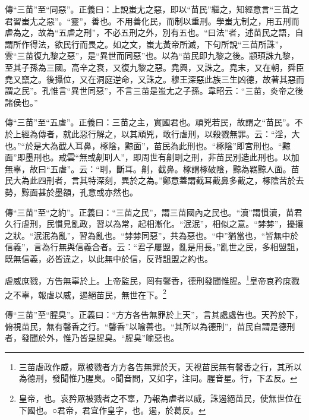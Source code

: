 {\noindent\zhuan{}\fzbyks 傳“三苗”至“同惡”。正義曰：上說蚩尢之惡，即以“苗民”繼之，知經意言“三苗之君習蚩尢之惡”。“靈”，善也。不用善化民，而制以重刑。學蚩尢制之，用五刑而虐為之，故為“五虐之刑”，不必五刑之外，別有五也。“曰法”者，述苗民之語，自謂所作得法，欲民行而畏之。如之文，蚩尢黃帝所滅，下句所說“三苗所誅”，雲“三苗復九黎之惡”，是“異世而同惡”也。以為“苗民即九黎之後。顓頊誅九黎，至其子孫為三國。高辛之衰，又復九黎之惡。堯興，又誅之。堯末，又在朝，舜臣堯又竄之。後攝位，又在洞庭逆命，又誅之。穆王深惡此族三生凶德，故著其惡而謂之民”。孔惟言“異世同惡”，不言三苗是蚩尢之子孫。韋昭云：“三苗，炎帝之後諸侯也。” \par}

{\noindent\zhuan{}\fzbyks 傳“三苗”至“五虐”。正義曰：三苗之主，實國君也。頑兇若民，故謂之“苗民”。不於上經為傳者，就此惡行解之，以其頑兇，敢行虐刑，以殺戮無罪。云：“淫，大也。”“於是大為截人耳鼻，椓陰，黥面”，苗民為此刑也。“椓陰”即宮刑也。“黥面”即墨刑也。戒雲“無或劓刵人”，即周世有劓刵之刑，非苗民別造此刑也。以加無辜，故曰“五虐”。云：“刵，斷耳。劓，截鼻。椓謂椓破陰，黥為羈黥人面。苗民大為此四刑者，言其特深刻，異於之為。”鄭意蓋謂截耳截鼻多截之，椓陰苦於去勢，黥面甚於墨頟，孔意或亦然也。 \par}

{\noindent\zhuan{}\fzbyks 傳“三苗”至“之約”。正義曰：“三苗之民”，謂三苗國內之民也。“瀆”謂慣瀆，苗君久行虐刑，民慣見亂政，習以為常，起相漸化。“泯泯”，相似之意。“棼棼”，擾攘之狀。“泯泯為亂”，習為亂也。“棼棼同惡”，共為惡也。“中”猶當也，“皆無中於信義”，言為行無與信義合者。云：“君子屢盟，亂是用長。”亂世之民，多相盟詛，既無信義，必皆違之，以此無中於信，反背詛盟之約也。 \par}

虐威庶戮，方告無辜於上。上帝監民，罔有馨香，德刑發聞惟腥。\footnote{三苗虐政作威，眾被戮者方方各告無罪於天，天視苗民無有馨香之行，其所以為德刑，發聞惟乃腥臭。○聞音問，又如字，注同。腥音星。行，下孟反。}皇帝哀矜庶戮之不辜，報虐以威，遏絕苗民，無世在下。\footnote{皇帝，也。哀矜眾被戮者之不辜，乃報為虐者以威，誅遏絕苗民，使無世位在下國也。○君帝，君宜作皇字，也。遏，於葛反。}

{\noindent\zhuan{}\fzbyks 傳“三苗”至“腥臭”。正義曰：“方方各告無罪於上天”，言其處處告也。天矜於下，俯視苗民，無有馨香之行。“馨香”以喻善也。“其所以為德刑”，苗民自謂是德刑者，發聞於外，惟乃皆是腥臭。“腥臭”喻惡也。 \par}


